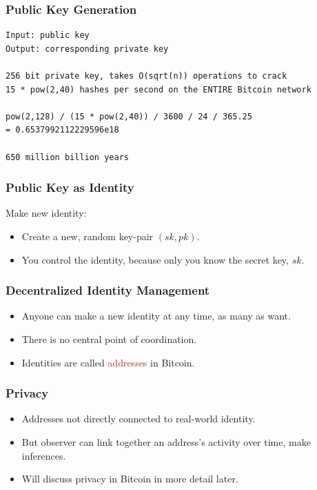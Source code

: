 \documentclass{beamer}
\begin{document}
\begin{frame}[fragile]
  \frametitle{Public Key Generation}

	\begin{verbatim}
Input: public key
Output: corresponding private key

256 bit private key, takes O(sqrt(n)) operations to crack
15 * pow(2,40) hashes per second on the ENTIRE Bitcoin network

pow(2,128) / (15 * pow(2,40)) / 3600 / 24 / 365.25
= 0.6537992112229596e18

650 million billion years

	\end{verbatim}
\end{frame}
\begin{frame}
  \frametitle{Public Key as Identity}
	Make new identity: 
	\begin{itemize}
		\item Create a new, random key-pair $(sk, pk)$.
		\item You control the identity, because only you know the secret key, $sk$.

	\end{itemize}
\end{frame}
\begin{frame}
  \frametitle{Decentralized Identity Management}
	\begin{itemize}
		\item Anyone can make a new identity at any time, as many as want.
		\item There is no central point of coordination.
		\item Identities are called \textcolor{brown}{addresses} in Bitcoin.
	\end{itemize}
\end{frame}
\begin{frame}
  \frametitle{Privacy}
	\begin{itemize}
		\item Addresses not directly connected to real-world identity.
		\item But observer can link together an address's activity over time, make inferences.
		\item Will discuss privacy in Bitcoin in more detail later.
	\end{itemize}
\end{frame}
\end{document}
